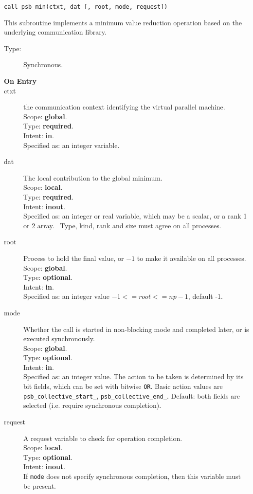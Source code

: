 \begin{verbatim}
call psb_min(ctxt, dat [, root, mode, request])
\end{verbatim}

This subroutine implements a minimum value reduction
operation based on the underlying communication library. 
\begin{description}
\item[Type:] Synchronous.
\item[\bf  On Entry ]
\item[ctxt] the communication context identifying the virtual
  parallel machine.\\
Scope: {\bf global}.\\
Type: {\bf required}.\\
Intent: {\bf in}.\\
Specified as: an integer variable.
\item[dat] The local contribution to the global minimum.\\
Scope: {\bf local}.\\
Type: {\bf required}.\\
Intent: {\bf inout}.\\
Specified as: an integer  or real variable, which may be a
scalar, or a rank 1 or 2 array. \
Type, kind, rank and size must agree on all processes.
\item[root] Process to hold the final value, or $-1$ to make it available
  on all processes.\\
Scope: {\bf global}.\\
Type: {\bf optional}.\\
Intent: {\bf in}.\\
Specified as: an integer value $-1<= root <= np-1$, default -1. \\
\item[mode] Whether the call is started in non-blocking mode and completed
  later, or is executed synchronously.\\
Scope: {\bf global}.\\
Type: {\bf optional}.\\
Intent: {\bf in}.\\
Specified as: an integer value. The action to be taken is determined
by its bit fields, which can be set with bitwise \verb|OR|. Basic
action values are \verb|psb_collective_start_|, \verb|psb_collective_end_|.
Default:  both fields are selected (i.e. require synchronous completion).\\
\item[request] A request variable to check for operation completion.\\
Scope: {\bf local}.\\
Type: {\bf optional}.\\
Intent: {\bf inout}.\\
If \verb|mode| does not specify synchronous completion, then this
variable must be present.
\end{description}


